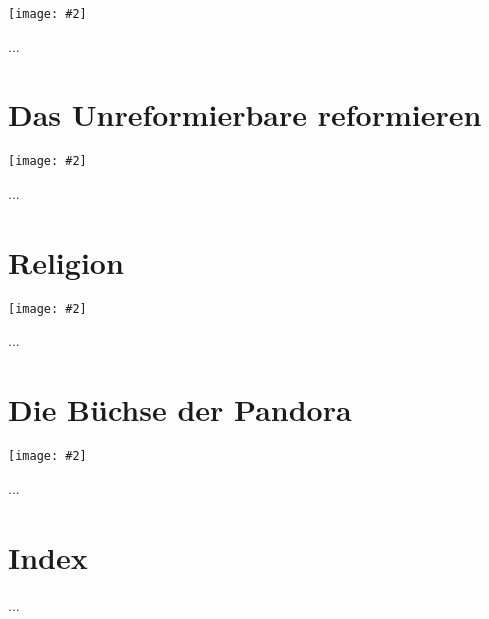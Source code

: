 \documentclass[12pt]{memoir}
\newcommand{\img}[3]{\begin{center}%
\texttt{[image: \#2]}\\{\small\em#3}%
\end{center}}
\begin{document}
\img{scale=1.2}{London_Bombings.jpg}{}

...

\chapter{Das Unreformierbare reformieren}

\img{scale=0.4}{Quranic_Script.jpg}{}

...

\chapter{Religion}

\img{scale=0.6}{Neasden_Temple.jpg}{}

...

\chapter{Die Büchse der Pandora}

\img{scale=0.5}{Pandoras_Box.jpg}{}

...

\backmatter

\chapter{Index}
...
\end{document}
